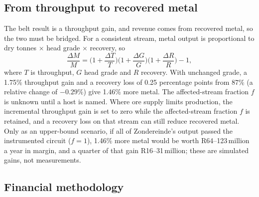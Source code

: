 \documentclass[10pt,a4paper,twocolumn]{article}
\begin{document}
\subsection{From throughput to recovered metal}\label{sec:value}

The belt result is a throughput gain, and revenue comes from recovered metal, so the two must be bridged. For a consistent stream, metal output is proportional to dry tonnes $\times$ head grade $\times$ recovery, so
\begin{equation}
\frac{\Delta M}{M} = \Big(1+\frac{\Delta T}{T}\Big)\Big(1+\frac{\Delta G}{G}\Big)\Big(1+\frac{\Delta R}{R}\Big) - 1 ,
\end{equation}
where $T$ is throughput, $G$ head grade and $R$ recovery. With unchanged grade, a 1.75\% throughput gain and a recovery loss of 0.25 percentage points from 87\% (a relative change of $-0.29\%$) give 1.46\% more metal. The affected-stream fraction $f$ is unknown until a host is named. Where ore supply limits production, the incremental throughput gain is set to zero while the affected-stream fraction $f$ is retained, and a recovery loss on that stream can still reduce recovered metal. Only as an upper-bound scenario, if all of Zondereinde's output passed the instrumented circuit ($f=1$), 1.46\% more metal would be worth R64--123\,million a year in margin, and a quarter of that gain R16--31\,million; these are simulated gains, not measurements.



\subsection{Financial methodology}\label{sec:finance}
\end{document}
